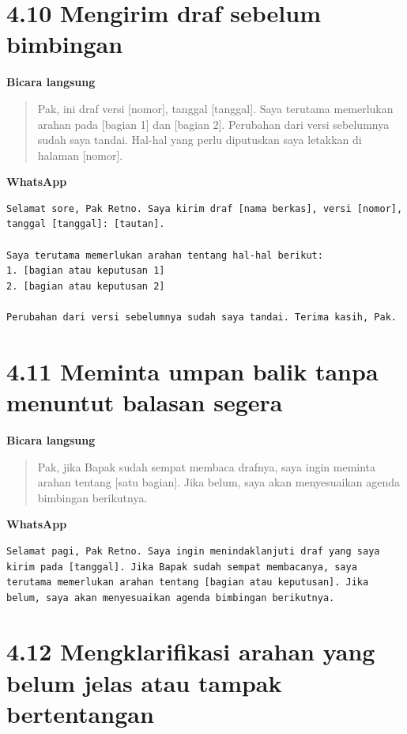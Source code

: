\documentclass[
  indonesian,
]{article}
\renewcommand{\subsection}{\section}
\begin{document}
\subsection{4.10 Mengirim draf sebelum
bimbingan}\label{mengirim-draf-sebelum-bimbingan}

\textbf{Bicara langsung}

\begin{quote}
Pak, ini draf versi {[}nomor{]}, tanggal {[}tanggal{]}. Saya terutama
memerlukan arahan pada {[}bagian 1{]} dan {[}bagian 2{]}. Perubahan dari
versi sebelumnya sudah saya tandai. Hal-hal yang perlu diputuskan saya
letakkan di halaman {[}nomor{]}.
\end{quote}

\textbf{WhatsApp}

\begin{verbatim}
Selamat sore, Pak Retno. Saya kirim draf [nama berkas], versi [nomor], tanggal [tanggal]: [tautan].

Saya terutama memerlukan arahan tentang hal-hal berikut:
1. [bagian atau keputusan 1]
2. [bagian atau keputusan 2]

Perubahan dari versi sebelumnya sudah saya tandai. Terima kasih, Pak.
\end{verbatim}

\subsection{4.11 Meminta umpan balik tanpa menuntut balasan
segera}\label{meminta-umpan-balik-tanpa-menuntut-balasan-segera}

\textbf{Bicara langsung}

\begin{quote}
Pak, jika Bapak sudah sempat membaca drafnya, saya ingin meminta arahan
tentang {[}satu bagian{]}. Jika belum, saya akan menyesuaikan agenda
bimbingan berikutnya.
\end{quote}

\textbf{WhatsApp}

\begin{verbatim}
Selamat pagi, Pak Retno. Saya ingin menindaklanjuti draf yang saya kirim pada [tanggal]. Jika Bapak sudah sempat membacanya, saya terutama memerlukan arahan tentang [bagian atau keputusan]. Jika belum, saya akan menyesuaikan agenda bimbingan berikutnya.
\end{verbatim}

\subsection{4.12 Mengklarifikasi arahan yang belum jelas atau tampak
bertentangan}\label{mengklarifikasi-arahan-yang-belum-jelas-atau-tampak-bertentangan}
\end{document}
